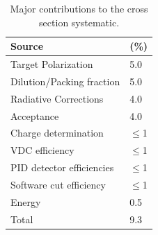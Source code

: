 
\begin{table}
\begin{center}
  \begin{tabular}{ll} \hline\hline
 Source    &  (\%) \\
  \hline \hline
   Target Polarization                  & 5.0     \\
   Dilution/Packing fraction            & 5.0      \\
   Radiative Corrections                & 4.0     \\
   Acceptance                           & 4.0      \\
   Charge determination      & $\le$1      \\
   VDC efficiency            & $\le$1      \\
   PID detector efficiencies & $\le$1 \\
   Software cut efficiency   & $\le$1 \\
   Energy                    & 0.5      \\
 \hline\hline
    Total                    & 9.3  \\
 \end{tabular}
\caption{\label{sys} Major contributions to the cross section systematic.}
 \end{center}
\end{table}



